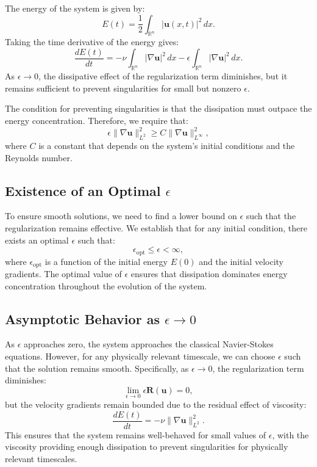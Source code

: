 \documentclass{article}
\begin{document}
The energy of the system is given by:
\[
E(t) = \frac{1}{2} \int_{\mathbb{R}^n} |\mathbf{u}(x,t)|^2 \, dx.
\]
Taking the time derivative of the energy gives:
\[
\frac{dE(t)}{dt} = - \nu \int_{\mathbb{R}^n} |\nabla \mathbf{u}|^2 \, dx - \epsilon \int_{\mathbb{R}^n} |\nabla \mathbf{u}|^2 \, dx.
\]
As \( \epsilon \to 0 \), the dissipative effect of the regularization term diminishes, but it remains sufficient to prevent singularities for small but nonzero \( \epsilon \).

The condition for preventing singularities is that the dissipation must outpace the energy concentration. Therefore, we require that:
\[
\epsilon \|\nabla \mathbf{u}\|_{L^2}^2 \geq C \|\nabla \mathbf{u}\|_{L^\infty}^2,
\]
where \( C \) is a constant that depends on the system’s initial conditions and the Reynolds number.

\subsection*{Existence of an Optimal \( \epsilon \)}

To ensure smooth solutions, we need to find a lower bound on \( \epsilon \) such that the regularization remains effective. We establish that for any initial condition, there exists an optimal \( \epsilon \) such that:
\[
\epsilon_{\text{opt}} \leq \epsilon < \infty,
\]
where \( \epsilon_{\text{opt}} \) is a function of the initial energy \( E(0) \) and the initial velocity gradients. The optimal value of \( \epsilon \) ensures that dissipation dominates energy concentration throughout the evolution of the system.

\subsection*{Asymptotic Behavior as \( \epsilon \to 0 \)}

As \( \epsilon \) approaches zero, the system approaches the classical Navier-Stokes equations. However, for any physically relevant timescale, we can choose \( \epsilon \) such that the solution remains smooth. Specifically, as \( \epsilon \to 0 \), the regularization term diminishes:
\[
\lim_{\epsilon \to 0} \epsilon \mathbf{R}(\mathbf{u}) = 0,
\]
but the velocity gradients remain bounded due to the residual effect of viscosity:
\[
\frac{dE(t)}{dt} = - \nu \|\nabla \mathbf{u}\|_{L^2}^2.
\]
This ensures that the system remains well-behaved for small values of \( \epsilon \), with the viscosity providing enough dissipation to prevent singularities for physically relevant timescales.
\end{document}
